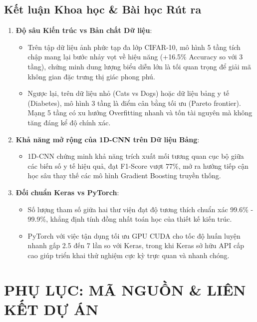 \documentclass[12pt,a4paper]{report}
\begin{document}
\section{Kết luận Khoa học \& Bài học Rút ra}
\begin{enumerate}
    \item \textbf{Độ sâu Kiến trúc vs Bản chất Dữ liệu}:
    \begin{itemize}
        \item Trên tập dữ liệu ảnh phức tạp đa lớp CIFAR-10, mô hình 5 tầng tích chập mang lại bước nhảy vọt về hiệu năng (+16.5\% Accuracy so với 3 tầng), chứng minh dung lượng biểu diễn lớn là tối quan trọng để giải mã không gian đặc trưng thị giác phong phú.
        \item Ngược lại, trên dữ liệu nhỏ (Cats vs Dogs) hoặc dữ liệu bảng y tế (Diabetes), mô hình 3 tầng là điểm cân bằng tối ưu (Pareto frontier). Mạng 5 tầng có xu hướng Overfitting nhanh và tốn tài nguyên mà không tăng đáng kể độ chính xác.
    \end{itemize}
    \item \textbf{Khả năng mở rộng của 1D-CNN trên Dữ liệu Bảng}:
    \begin{itemize}
        \item 1D-CNN chứng minh khả năng trích xuất mối tương quan cục bộ giữa các biến số y tế hiệu quả, đạt F1-Score vượt 77\%, mở ra hướng tiếp cận học sâu thay thế các mô hình Gradient Boosting truyền thống.
    \end{itemize}
    \item \textbf{Đối chuẩn Keras vs PyTorch}:
    \begin{itemize}
        \item Số lượng tham số giữa hai thư viện đạt độ tương thích chuẩn xác 99.6\% - 99.9\%, khẳng định tính đồng nhất toán học của thiết kế kiến trúc.
        \item PyTorch với việc tận dụng tối ưu GPU CUDA cho tốc độ huấn luyện nhanh gấp 2.5 đến 7 lần so với Keras, trong khi Keras sở hữu API cấp cao giúp triển khai thử nghiệm cực kỳ trực quan và nhanh chóng.
    \end{itemize}
\end{enumerate}

\chapter*{PHỤ LỤC: MÃ NGUỒN \& LIÊN KẾT DỰ ÁN}
\end{document}
